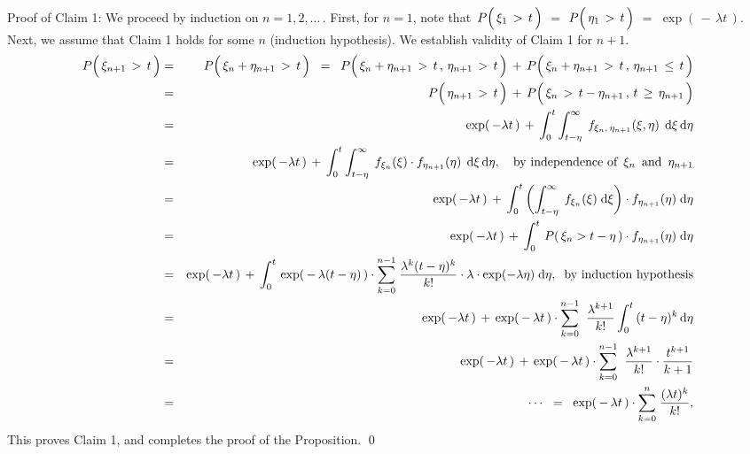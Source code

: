 \vskip 0.2cm
\noindent
Proof of Claim 1:\quad
We proceed by induction on $n = 1, 2, \ldots$\,.
\vskip 0.2cm
\noindent
First, for $n = 1$, note that
\,$P\!\left(\, \xi_{1} \,\overset{{\color{white}.}}{>}\, t \,\right)$
$=$ $P\!\left(\, \eta_{1} \,\overset{{\color{white}.}}{>}\, t \,\right)$
$=$ $\exp(\,-\,\lambda t\,)$.\,
Next, we assume that Claim 1 holds for some $n$ (induction hypothesis).
We establish validity of Claim 1 for $n+1$.
\begin{eqnarray*}
P\!\left(\, \xi_{n+1} \,\overset{{\color{white}.}}{>}\, t \,\right)
& = &
	P\!\left(\, \xi_{n} + \eta_{n+1} \,\overset{{\color{white}.}}{>}\, t \,\right)
\;\; = \;\;
	P\!\left(\, \xi_{n} + \eta_{n+1} \,\overset{{\color{white}.}}{>}\, t \,,\, \eta_{n+1} \,>\, t \,\right)
	\, + \,
	P\!\left(\, \xi_{n} + \eta_{n+1} \,\overset{{\color{white}.}}{>}\, t \,,\, \eta_{n+1} \,\leq\, t \,\right)
\\
& = &
	P\!\left(\, \eta_{n+1} \,\overset{{\color{white}.}}{>}\, t \,\right)
	\, + \,
	P\!\left(\, \xi_{n} \,\overset{{\color{white}.}}{>}\, t - \eta_{n+1} \,,\, t \,\geq\, \eta_{n+1} \,\right)
\\
& = &
	\exp(\,-\lambda t\,)
	\, + \,
	\int_{0}^{t}\int_{t-\eta}^{\infty}\; f_{\xi_{n},\,\eta_{n+1}}(\xi,\eta) \;\,\d\xi\,\d\eta
\\
& = &
	\exp(\,-\lambda t\,)
	\, + \,
	\int_{0}^{t}\int_{t-\eta}^{\infty}\; f_{\xi_{n}}(\xi) \cdot f_{\eta_{n+1}}(\eta) \;\,\d\xi\,\d\eta,
	\quad
	\textnormal{by independence of \,$\xi_{n}$\, and \,$\eta_{n+1}$}
\\
& = &
	\exp(\,-\lambda t\,)
	\, + \,
	\int_{0}^{t}\left(\int_{t-\eta}^{\infty}\; f_{\xi_{n}}(\xi) \;\d\xi \right) \cdot f_{\eta_{n+1}}(\eta)\;\d\eta
\\
& = &
	\exp(\,-\lambda t\,)
	\, + \,
	\int_{0}^{t}\,P(\,\xi_{n}>t-\eta\,) \cdot f_{\eta_{n+1}}(\eta)\;\d\eta
\\
& = &
	\exp(\,-\lambda t\,)
	\, + \,
	\int_{0}^{t}\,
		\exp(\,-\,\lambda (t-\eta)\,)
		\cdot
		\overset{n-1}{\underset{k=0}{\sum}}\;
		\dfrac{\lambda^{k}(t-\eta)^{k}}{k!}
		\cdot
		\lambda\cdot\exp(-\lambda\eta)
		\;\d\eta,
	\;\;
	\textnormal{by induction hypothesis}
\\
& = &
	\exp(\,-\lambda t\,)
	\, + \,
	\exp(\,-\,\lambda t\,)
	\cdot
	\overset{n-1}{\underset{k=0}{\sum}}\;\;
	\dfrac{\lambda^{k+1}}{k!}
	\int_{0}^{t}\,
		(t-\eta)^{k}
		\,\d\eta
\\
& = &
	\exp(\,-\lambda t\,)
	\, + \,
	\exp(\,-\,\lambda t\,)
	\cdot
	\overset{n-1}{\underset{k=0}{\sum}}\;\;
	\dfrac{\lambda^{k+1}}{k!}
	\cdot
	\dfrac{t^{k+1}}{k+1}
\\
& = &
	\cdots
\;\; = \;\;
	\exp(\,-\,\lambda t\,)
	\cdot
	\overset{n}{\underset{k=0}{\sum}}\;
	\dfrac{(\lambda t)^{k}}{k!},
\end{eqnarray*}
This proves Claim 1, and completes the proof of the Proposition.
\qed

